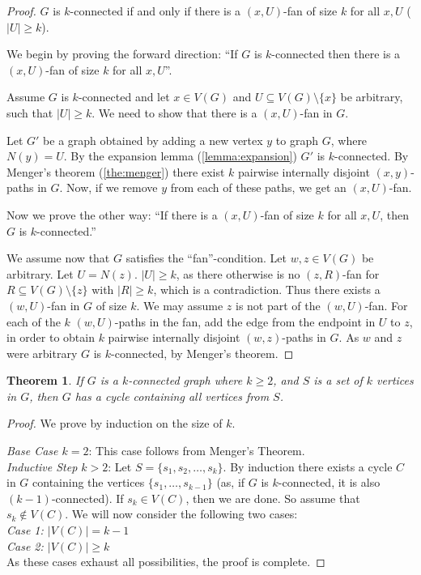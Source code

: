 \documentclass{Book}
\newtheorem{theorem}{Theorem}
\begin{document}
\begin{proof}
	$G$ is $k$-connected if and only if there is a $(x,U)$-fan of size $k$ for all $x, U$ ($|U| \ge k$).

	We begin by proving the forward direction: ``If $G$ is $k$-connected then there is a $(x,U)$-fan of size $k$ for all $x,U$''.

	Assume $G$ is $k$-connected and let $x \in V(G)$ and $U \subseteq V(G) \setminus \{x\}$ be arbitrary, such that $|U| \ge k$. We need to show that there is a $(x,U)$-fan in $G$.

	Let $G'$ be a graph obtained by adding a new vertex $y$ to graph $G$, where $N(y) = U$. By the expansion lemma (\ref{lemma:expansion}) $G'$ is $k$-connected. By Menger's theorem (\ref{the:menger}) there exist $k$ pairwise internally disjoint $(x,y)$-paths in $G$. Now, if we remove $y$ from each of these paths, we get an $(x,U)$-fan.

	Now we prove the other way: ``If there is a $(x,U)$-fan of size $k$ for all $x,U$, then $G$ is $k$-connected.''

	We assume now that $G$ satisfies the ``fan''-condition. Let $w,z \in V(G)$ be arbitrary. Let $U = N(z)$. $|U| \ge k$, as there otherwise is no $(z,R)$-fan for $R \subseteq V(G) \setminus \{z\}$ with $|R| \ge k$, which is a contradiction. Thus there exists a $(w,U)$-fan in $G$ of size $k$. We may assume $z$ is not part of the $(w,U)$-fan. For each of the $k$ $(w,U)$-paths in the fan, add the edge from the endpoint in $U$ to $z$, in order to obtain $k$ pairwise internally disjoint $(w,z)$-paths in $G$. As $w$ and $z$ were arbitrary $G$ is $k$-connected, by Menger's theorem.
\end{proof}

\begin{theorem}
	If $G$ is a $k$-connected graph where $k \ge 2$, and $S$ is a set of $k$ vertices in $G$, then $G$ has a cycle containing all vertices from $S$.
\end{theorem}

\begin{proof}
	We prove by induction on the size of $k$.

	\textit{Base Case $k = 2$}: This case follows from Menger's Theorem.\\
	\noindent
	\textit{Inductive Step $k > 2$}: Let $S = \{s_{1}, s_{2}, \ldots, s_{k}\}$. By induction there exists a cycle $C$ in $G$ containing the vertices $\{s_{1}, \ldots, s_{k-1}\}$ (as, if $G$ is $k$-connected, it is also $(k-1)$-connected). If $s_{k} \in V(C)$, then we are done. So assume that $s_{k} \notin V(C)$. We will now consider the following two cases:
	\\
	\noindent
	\textit{Case 1: $|V(C)| = k -1 $}\\
	\noindent
	\textit{Case 2: $|V(C)| \ge k$}\\
	\noindent
	As these cases exhaust all possibilities, the proof is complete.
\end{proof}
\end{document}
